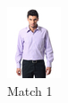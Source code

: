 \begin{figure}[H]
  \centering
  \begin{subfigure}[b]{0.19\textwidth}
      \includegraphics[width=\textwidth]{images/2output1.jpeg}
      \caption{Match 1}
  \end{subfigure}
  \begin{subfigure}[b]{0.19\textwidth}

\end{subfigure}
\end{figure}
